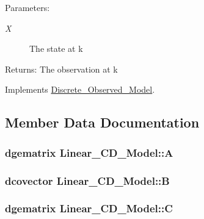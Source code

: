 \begin{Desc}
\item[Parameters:]
\begin{description}
\item[{\em X}]The state at k\end{description}
\end{Desc}
\begin{Desc}
\item[Returns:]The observation at k \end{Desc}


Implements \hyperlink{class_discrete___observed___model_8d56d86ea6b204672c8ebd720f1e11a6}{Discrete\_\-Observed\_\-Model}.

\subsection{Member Data Documentation}
\hypertarget{class_linear___c_d___model_d64d1305f494961cffd5d66cb3d24402}{
\subsubsection[{A}]{\setlength{\rightskip}{0pt plus 5cm}dgematrix {\bf Linear\_\-CD\_\-Model::A}}}
\label{class_linear___c_d___model_d64d1305f494961cffd5d66cb3d24402}


\hypertarget{class_linear___c_d___model_57d5af4675a8f42aeefa2bd393b4a7a9}{
\subsubsection[{B}]{\setlength{\rightskip}{0pt plus 5cm}dcovector {\bf Linear\_\-CD\_\-Model::B}}}
\label{class_linear___c_d___model_57d5af4675a8f42aeefa2bd393b4a7a9}


\hypertarget{class_linear___c_d___model_f2f4e6e226be8baf21fc70e83364a133}{
\subsubsection[{C}]{\setlength{\rightskip}{0pt plus 5cm}dgematrix {\bf Linear\_\-CD\_\-Model::C}}}
\label{class_linear___c_d___model_f2f4e6e226be8baf21fc70e83364a133}



